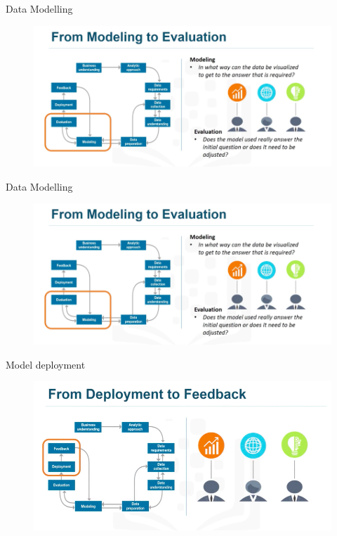 \documentclass{beamer}
\begin{document}
\begin{frame}{Data Modelling}
	\begin{figure}
		\includegraphics[width=\textwidth]{Modelling.png}
	\end{figure}
\end{frame}




\begin{frame}{Data Modelling}
	\begin{figure}
		\includegraphics[width=\textwidth]{Modelling.png}
	\end{figure}
\end{frame}

\begin{frame}{Model deployment}
	\begin{figure}
		\includegraphics[width=\textwidth]{deploy.png}
	\end{figure}
\end{frame}
\end{document}
